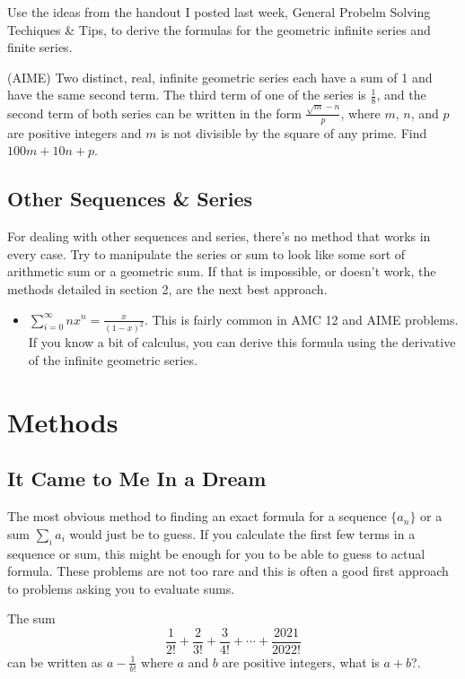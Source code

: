 \documentclass[11pt]{article}
\begin{document}
\begin{exercise} 
    Use the ideas from the handout I posted last week, General Probelm Solving Techiques \& Tips, to derive the formulas for the geometric infinite series and finite series. 
\end{exercise}

\begin{exercise}
(AIME) Two distinct, real, infinite geometric series each have a sum of 1 and have the same second term. The third
term of one of the series is $\frac{1}{8}$, and the second term of both series can be written in the form $\frac{\sqrt{m} - n} {p}$, where
$m$, $n$, and $p$ are positive integers and $m$ is not divisible by the square of any prime. Find $100m + 10n + p$.
\end{exercise}
\subsection{Other Sequences \& Series}
For dealing with other sequences and series, there's no method that works in every case. Try to manipulate the series or sum to look like some sort of arithmetic sum or a geometric sum. If that is impossible, or doesn't work, the methods detailed in section 2, are the next best approach.

\begin{itemize}
\item { $\displaystyle \sum_{i=0}^\infty n x^n = \frac{x}{(1-x)^2}$. This is fairly common in AMC 12 and AIME problems. If you know a bit of calculus, you can derive this formula using the derivative of the infinite geometric series.}
\end{itemize}
\section{Methods}

\subsection{It Came to Me In a Dream}
The most obvious method to finding an exact formula for a sequence $\{a_n\}$ or a sum $\sum_i a_i$ would just be to guess. If you calculate the first few terms in a sequence or sum, this might be enough for you to be able to guess to actual formula. These problems are not too rare and this is often a good first approach to problems
asking you to evaluate sums.
\begin{exercise}
The sum
\[
\frac{1}{2!} + \frac{2}{3!} + \frac{3}{4!} + \cdots + \frac{2021}{2022!}
\]
can be written as $a-\frac{1}{b!}$ where $a$ and $b$ are positive integers, what is $a+b$?.
\end{exercise}
\end{document}
